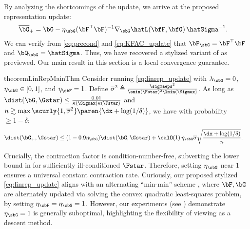 By analyzing the shortcomings of the \SGD  update, we arrive at the proposed representation update:
\begin{align*}
    \overline\bG_+ &= \bG - \eta_\sbG (\bF^\top \bF)^{-1}  \nabla_{\sbG} \hatL(\bfF, \bfG) \,\hatSigma^{-1}.
\end{align*}
We can verify from \eqref{eq:precond} and \eqref{eq:KFAC_update} that $\bP_\sbG = \bF^\top \bF$ and $\bQ_\sbG = \hatSigma$.
Thus, we have recovered a stylized variant of \KFAC  as previewed. Our main result in this section is a local convergence guarantee.
\fussy
\begin{restatable}{theorem}{LinRepMainThm}\label{thm:linrep_kfac_guarantee}
    Consider running \eqref{eq:linrep_update} with $\lambda_\sbG = 0$, $\eta_\sbG \in [0,1]$, and $\eta_\sbF = 1$. Define $\overline\sigma^2 \triangleq \frac{\sigmaeps^2}{\smin(\Fstar)^2\lmin(\Sigmax)}$. As long as $\dist(\bG, \Gstar) \leq \frac{0.01}{\kappa(\Sigmax)\kappa(\Fstar)}$ and $n \gtrsim  \max\scurly{1,\overline\sigma^2} \paren{\dx + \log(1/\delta)}$, we have with probability $\geq 1 - \delta$:
    \begin{align*}
        \dist(\bG_+, \Gstar) &\leq (1 - 0.9\eta_\sbG) \dist(\bG, \Gstar) + \calO(1)\, \eta_\sbG \overline\sigma\sqrt{\frac{\dx+\log(1/\delta)}{n}}.
    \end{align*}
\end{restatable}
\sloppy
Crucially, the contraction factor is condition-number-free, subverting the lower bound in  for sufficiently ill-conditioned $\Fstar$. Therefore, setting $\eta_\sbG$ near $1$ ensures a universal constant contraction rate.
Curiously, our proposed stylized \KFAC \eqref{eq:linrep_update} aligns with an alternating ``min-min'' scheme \cite{jain2013low, thekumparampil2021sample}, where $\bF,\bG$ are alternately updated via solving the convex quadratic least-squares problem, by setting $\eta_\sbF = \eta_\sbG = 1$. However, our experiments (see ) demonstrate $\eta_\sbG = 1$ is generally suboptimal, highlighting the flexibility of viewing \KFAC as a descent method.

